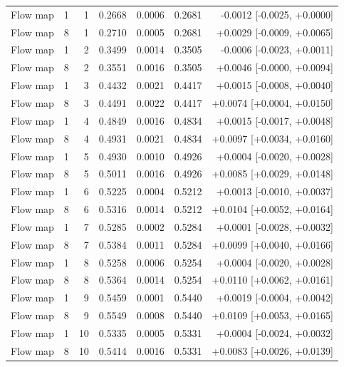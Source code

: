 \begin{tabular}{lrrrrrr}
Flow map & 1 & 1 & 0.2668 & 0.0006 & 0.2681 & -0.0012 [-0.0025, +0.0000] \\
Flow map & 8 & 1 & 0.2710 & 0.0005 & 0.2681 & +0.0029 [-0.0009, +0.0065] \\
Flow map & 1 & 2 & 0.3499 & 0.0014 & 0.3505 & -0.0006 [-0.0023, +0.0011] \\
Flow map & 8 & 2 & 0.3551 & 0.0016 & 0.3505 & +0.0046 [-0.0000, +0.0094] \\
Flow map & 1 & 3 & 0.4432 & 0.0021 & 0.4417 & +0.0015 [-0.0008, +0.0040] \\
Flow map & 8 & 3 & 0.4491 & 0.0022 & 0.4417 & +0.0074 [+0.0004, +0.0150] \\
Flow map & 1 & 4 & 0.4849 & 0.0016 & 0.4834 & +0.0015 [-0.0017, +0.0048] \\
Flow map & 8 & 4 & 0.4931 & 0.0021 & 0.4834 & +0.0097 [+0.0034, +0.0160] \\
Flow map & 1 & 5 & 0.4930 & 0.0010 & 0.4926 & +0.0004 [-0.0020, +0.0028] \\
Flow map & 8 & 5 & 0.5011 & 0.0016 & 0.4926 & +0.0085 [+0.0029, +0.0148] \\
Flow map & 1 & 6 & 0.5225 & 0.0004 & 0.5212 & +0.0013 [-0.0010, +0.0037] \\
Flow map & 8 & 6 & 0.5316 & 0.0014 & 0.5212 & +0.0104 [+0.0052, +0.0164] \\
Flow map & 1 & 7 & 0.5285 & 0.0002 & 0.5284 & +0.0001 [-0.0028, +0.0032] \\
Flow map & 8 & 7 & 0.5384 & 0.0011 & 0.5284 & +0.0099 [+0.0040, +0.0166] \\
Flow map & 1 & 8 & 0.5258 & 0.0006 & 0.5254 & +0.0004 [-0.0020, +0.0028] \\
Flow map & 8 & 8 & 0.5364 & 0.0014 & 0.5254 & +0.0110 [+0.0062, +0.0161] \\
Flow map & 1 & 9 & 0.5459 & 0.0001 & 0.5440 & +0.0019 [-0.0004, +0.0042] \\
Flow map & 8 & 9 & 0.5549 & 0.0008 & 0.5440 & +0.0109 [+0.0053, +0.0165] \\
Flow map & 1 & 10 & 0.5335 & 0.0005 & 0.5331 & +0.0004 [-0.0024, +0.0032] \\
Flow map & 8 & 10 & 0.5414 & 0.0016 & 0.5331 & +0.0083 [+0.0026, +0.0139] \\
\bottomrule
\end{tabular}
